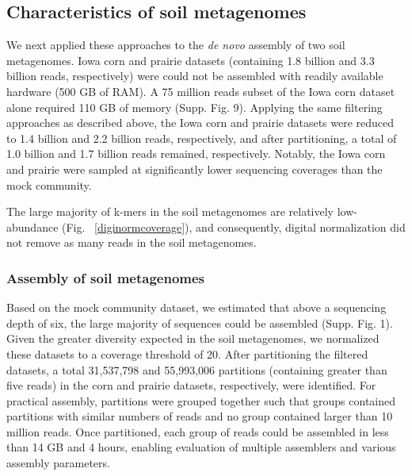 \documentclass[11pt]{article} %
\begin{document}
\subsection{Characteristics of soil metagenomes}

We next applied these approaches to the {\em de novo} assembly of two soil
metagenomes.  Iowa corn and prairie
datasets (containing 1.8 billion and 3.3 billion reads, respectively)
were could not be assembled with readily available hardware (500 GB of RAM).
A 75 million reads subset of the Iowa corn dataset alone required
110 GB of memory (Supp. Fig. 9).  Applying the same
filtering approaches as described above, the Iowa corn and prairie
datasets were reduced to 1.4 billion and 2.2 billion reads,
respectively, and after partitioning, a total of 1.0 billion and 1.7
billion reads remained, respectively.  Notably, the Iowa corn and
prairie were sampled at significantly lower sequencing coverages than
the mock community.


The large majority of k-mers in the soil metagenomes are relatively
low-abundance (Fig. ~\ref{diginormcoverage}), and consequently,
digital normalization did not remove as many reads in the soil
metagenomes.

\subsubsection{Assembly of soil metagenomes}

Based on the mock community dataset, we estimated that above a
sequencing depth of six, the large majority of sequences could be
assembled (Supp. Fig. 1).  Given the greater
diversity expected in the soil metagenomes, we normalized these
datasets to a coverage threshold of 20.  After partitioning the
filtered datasets, a total 31,537,798 and 55,993,006 partitions
(containing greater than five reads) in the corn and prairie datasets,
respectively, were identified.  For practical assembly, partitions
were grouped together such that groups contained partitions with
similar numbers of reads and no group contained larger than 10 million
reads.  Once partitioned, each group of reads could be assembled in
less than 14 GB and 4 hours, enabling evaluation of multiple
assemblers and various assembly parameters.
\end{document}
